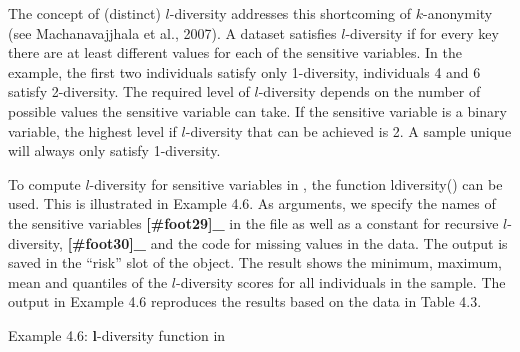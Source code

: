 \documentclass[letterpaper,10pt,english]{sphinxmanual}
\begin{document}
The concept of (distinct) \(l\)-diversity addresses this shortcoming
of \(k\)-anonymity (see Machanavajjhala et al., 2007). A dataset
satisfies \(l\)-diversity if for every key  there are at least
 different values for each of the sensitive variables. In the
example, the first two individuals satisfy only 1-diversity, individuals
4 and 6 satisfy 2-diversity. The required level of \(l\)-diversity
depends on the number of possible values the sensitive variable can
take. If the sensitive variable is a binary variable, the highest level
if \(l\)-diversity that can be achieved is 2. A sample unique will
always only satisfy 1-diversity.

To compute \(l\)-diversity for sensitive variables in ,
the function ldiversity() can be used. This is illustrated in Example
4.6. As arguments, we specify the names of the sensitive
variables {\color{red}\bfseries{}{[}\#foot29{]}\_} in the file as well as a constant for
recursive \(l\)-diversity, {\color{red}\bfseries{}{[}\#foot30{]}\_} and the code for
missing values in the data. The output is saved in the “risk” slot of
the  object. The result shows the minimum, maximum, mean and
quantiles of the \(l\)-diversity scores for all individuals in the
sample. The output in Example 4.6 reproduces the results based on the
data in Table 4.3.

Example 4.6: \(\mathbf{l}\)-diversity function in 
\end{document}
